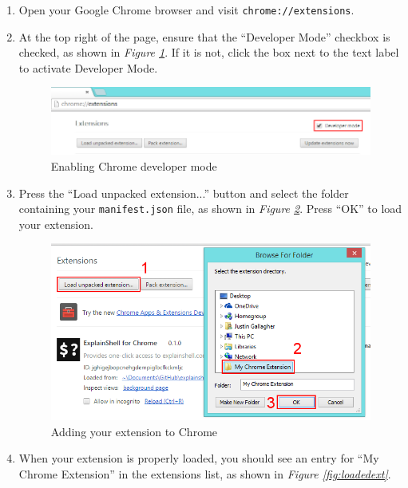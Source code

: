 \documentclass[11pt]{article}
\begin{document}
\begin{enumerate}
	\item Open your Google Chrome browser and visit \texttt{chrome://extensions}.
	\item At the top right of the page, ensure that the ``Developer Mode'' checkbox is checked, as shown in \emph{Figure \ref{fig:devmode}}. If it is not, click the box next to the text label to activate Developer Mode.

	\begin{figure}[htb]
	\centering
	\includegraphics[width=1\textwidth]{figures/devmode.png}
	\caption{Enabling Chrome developer mode\label{fig:devmode}}
	\end{figure}

	\item Press the ``Load unpacked extension...'' button and select the folder containing your \texttt{manifest.json} file, as shown in \emph{Figure \ref{fig:loadext}}. Press ``OK'' to load your extension.

	\begin{figure}[htb]
	\centering
	\includegraphics[height=0.5\textwidth]{figures/loadext.png}
	\caption{Adding your extension to Chrome\label{fig:loadext}}
	\end{figure}

	\item When your extension is properly loaded, you should see an entry for ``My Chrome Extension'' in the extensions list, as shown in \emph{Figure \ref{fig:loadedext}}.


\end{enumerate}
\end{document}
